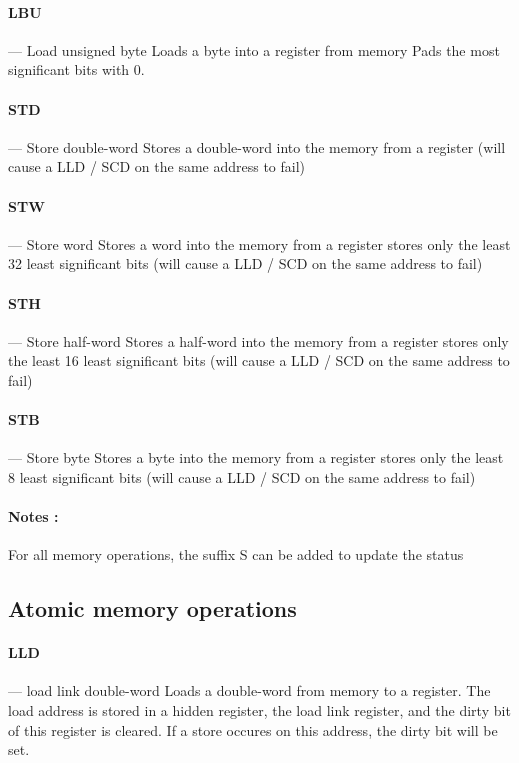 \documentclass[11pt]{article}
\begin{document}
\paragraph{LBU} --- Load unsigned byte\newline
Loads a byte into a register from memory
Pads the most significant bits with 0.

\paragraph{STD} --- Store double-word\newline
Stores a double-word into the memory from a register 
(will cause a LLD / SCD on the same address to fail)

\paragraph{STW} --- Store word\newline
Stores a word into the memory from a register 
stores only the least 32 least significant bits
(will cause a LLD / SCD on the same address to fail)

\paragraph{STH} --- Store half-word\newline
Stores a half-word into the memory from a register
stores only the least 16 least significant bits
(will cause a LLD / SCD on the same address to fail)

\paragraph{STB} --- Store byte\newline
Stores a byte into the memory from a register
stores only the least 8 least significant bits
(will cause a LLD / SCD on the same address to fail)

\paragraph{Notes : }
For all memory operations, the suffix S can be added to update the status

\newpage
\subsection{Atomic memory operations}

\paragraph{LLD} --- load link double-word\newline
Loads a double-word from memory to a register. The load address is
stored in a hidden register, the load link register, and the dirty bit of this
register is cleared. If a store occures on this address, the dirty bit will be
set.
\end{document}
